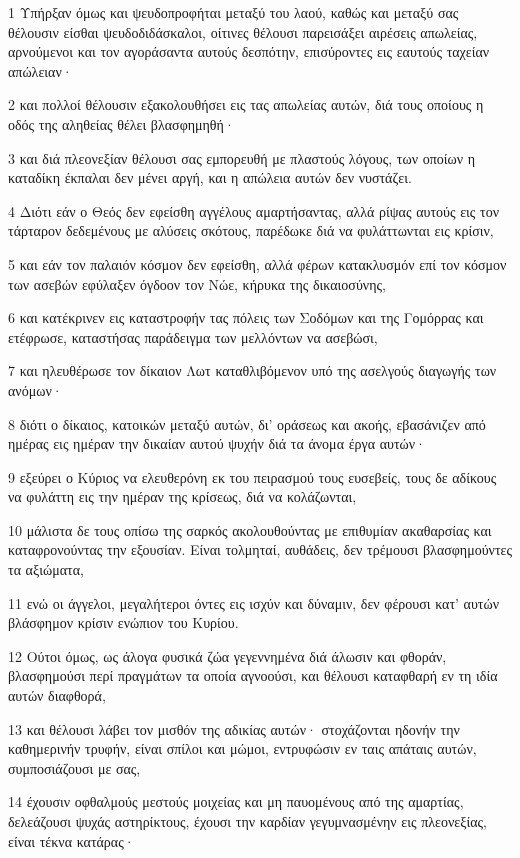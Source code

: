 \par 1 Υπήρξαν όμως και ψευδοπροφήται μεταξύ του λαού, καθώς και μεταξύ σας θέλουσιν είσθαι ψευδοδιδάσκαλοι, οίτινες θέλουσι παρεισάξει αιρέσεις απωλείας, αρνούμενοι και τον αγοράσαντα αυτούς δεσπότην, επισύροντες εις εαυτούς ταχείαν απώλειαν·
\par 2 και πολλοί θέλουσιν εξακολουθήσει εις τας απωλείας αυτών, διά τους οποίους η οδός της αληθείας θέλει βλασφημηθή·
\par 3 και διά πλεονεξίαν θέλουσι σας εμπορευθή με πλαστούς λόγους, των οποίων η καταδίκη έκπαλαι δεν μένει αργή, και η απώλεια αυτών δεν νυστάζει.
\par 4 Διότι εάν ο Θεός δεν εφείσθη αγγέλους αμαρτήσαντας, αλλά ρίψας αυτούς εις τον τάρταρον δεδεμένους με αλύσεις σκότους, παρέδωκε διά να φυλάττωνται εις κρίσιν,
\par 5 και εάν τον παλαιόν κόσμον δεν εφείσθη, αλλά φέρων κατακλυσμόν επί τον κόσμον των ασεβών εφύλαξεν όγδοον τον Νώε, κήρυκα της δικαιοσύνης,
\par 6 και κατέκρινεν εις καταστροφήν τας πόλεις των Σοδόμων και της Γομόρρας και ετέφρωσε, καταστήσας παράδειγμα των μελλόντων να ασεβώσι,
\par 7 και ηλευθέρωσε τον δίκαιον Λωτ καταθλιβόμενον υπό της ασελγούς διαγωγής των ανόμων·
\par 8 διότι ο δίκαιος, κατοικών μεταξύ αυτών, δι' οράσεως και ακοής, εβασάνιζεν από ημέρας εις ημέραν την δικαίαν αυτού ψυχήν διά τα άνομα έργα αυτών·
\par 9 εξεύρει ο Κύριος να ελευθερόνη εκ του πειρασμού τους ευσεβείς, τους δε αδίκους να φυλάττη εις την ημέραν της κρίσεως, διά να κολάζωνται,
\par 10 μάλιστα δε τους οπίσω της σαρκός ακολουθούντας με επιθυμίαν ακαθαρσίας και καταφρονούντας την εξουσίαν. Είναι τολμηταί, αυθάδεις, δεν τρέμουσι βλασφημούντες τα αξιώματα,
\par 11 ενώ οι άγγελοι, μεγαλήτεροι όντες εις ισχύν και δύναμιν, δεν φέρουσι κατ' αυτών βλάσφημον κρίσιν ενώπιον του Κυρίου.
\par 12 Ούτοι όμως, ως άλογα φυσικά ζώα γεγεννημένα διά άλωσιν και φθοράν, βλασφημούσι περί πραγμάτων τα οποία αγνοούσι, και θέλουσι καταφθαρή εν τη ιδία αυτών διαφθορά,
\par 13 και θέλουσι λάβει τον μισθόν της αδικίας αυτών· στοχάζονται ηδονήν την καθημερινήν τρυφήν, είναι σπίλοι και μώμοι, εντρυφώσιν εν ταις απάταις αυτών, συμποσιάζουσι με σας,
\par 14 έχουσιν οφθαλμούς μεστούς μοιχείας και μη παυομένους από της αμαρτίας, δελεάζουσι ψυχάς αστηρίκτους, έχουσι την καρδίαν γεγυμνασμένην εις πλεονεξίας, είναι τέκνα κατάρας·
